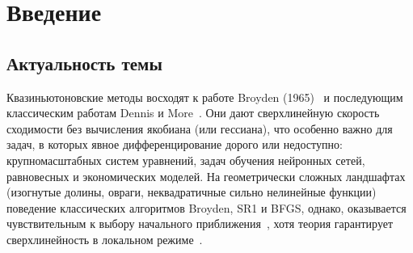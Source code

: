 
\chapter*{Введение}

\section*{Актуальность темы}

Квазиньютоновские методы восходят к работе Broyden (1965)~\cite{broyden1965}
и последующим классическим работам Dennis и More~\cite{dennis1977,dennis1996}.
Они дают сверхлинейную скорость сходимости без вычисления якобиана
(или гессиана), что особенно важно для задач, в которых явное
дифференцирование дорого или недоступно: крупномасштабных систем
уравнений, задач обучения нейронных сетей, равновесных и экономических
моделей. На геометрически сложных ландшафтах (изогнутые долины, овраги,
неквадратичные сильно нелинейные функции) поведение классических
алгоритмов Broyden, SR1 и BFGS, однако, оказывается чувствительным
к выбору начального
приближения~\cite{more1981,dennis1996,conn1991,shannophua1978}, хотя
теория гарантирует сверхлинейность в локальном
режиме~\cite{broyden1973,dennis1974}.

